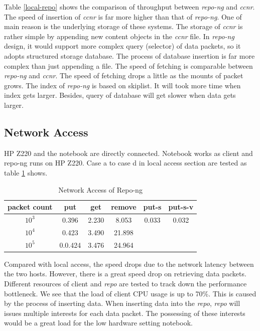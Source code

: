 \documentclass[conference]{IEEEtran}
\begin{document}
Table \ref{local-repo} shows the comparison of throughput between \emph{repo-ng} and \emph{ccnr}. The speed of insertion of \emph{ccnr} is far more higher than that of \emph{repo-ng}. One of main reason is the underlying storage of these systems. The storage of \emph{ccnr} is rather simple by appending new content objects in the \emph{ccnr} file. In \emph{repo-ng} design, it would support more complex query (selector) of data packets, so it adopts structured storage database. The process of database insertion is far more complex than just appending a file. The speed of fetching is comparable between \emph{repo-ng} and \emph{ccnr}. The speed of fetching drops a little as the mounts of packet grows. The index of \emph{repo-ng} is based on skiplist. It will took more time when index gets larger. Besides, query of database will get slower when data gets larger.

\subsection{Network Access}
HP Z220 and the notebook are directly connected. Notebook works as client and repo-ng runs on HP Z220. Case a to case d in local access section are tested as table \ref{network-repo} shows.

\begin{table}[htbp]
\centering
\caption{Network Access of Repo-ng}
\label{network-repo}
\begin{tabular}{ | c | c | c | c | c | c | }
    \hline
    packet count & put & get & remove & put-s & put-s-v \\ \hline
    $10^3$ & 0.396 & 2.230 & 8.053 & 0.033 & 0.032  \\ \hline
    $10^4$ & 0.423 & 3.490 & 21.898 & & \\ \hline
    $10^5$ & 0.0.424 & 3.476 & 24.964 & & \\ \hline
\end{tabular}
\end{table}

Compared with local access, the speed drops due to the network latency between the two hosts. However, there is a great speed drop on retrieving data packets. Different resources of client and \emph{repo} are tested to track down the performance bottleneck. We see that the  load of client CPU usage is up to 70\%. This is caused by the process of inserting data. When inserting data into the \emph{repo}, \emph{repo} will issues multiple interests for each data packet. The possessing of these interests would be a great load for the low hardware setting notebook.
\end{document}
